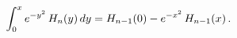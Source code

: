 \[\int_{0}^{x}e^{-y^{2}}\mathop{H_{n}\/}\nolimits\!\left(y\right)dy=\mathop{H_{n%
-1}\/}\nolimits\!\left(0\right)-e^{-x^{2}}\mathop{H_{n-1}\/}\nolimits\!\left(x%
\right).\]